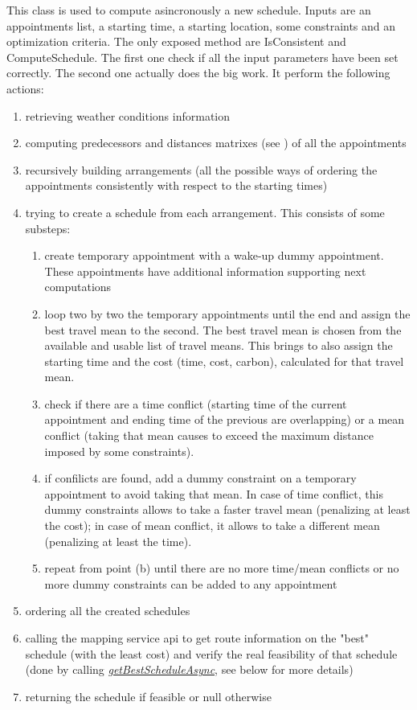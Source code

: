 This class is used to compute asincronously a new schedule. Inputs are an appointments list, a starting time, a starting location, some constraints and an optimization criteria. The only exposed method are IsConsistent and ComputeSchedule. The first one check if all the input parameters have been set correctly. The second one actually does the big work. It perform the following actions:
\begin{enumerate}
\item retrieving weather conditions information
\item computing predecessors and distances matrixes (see ) of all the appointments
\item recursively building arrangements (all the possible ways of ordering the  appointments consistently with respect to the starting times)
\item trying to create a schedule from each arrangement. This consists of some substeps:
\begin{enumerate}
\item create temporary appointment with a wake-up dummy appointment. These appointments have additional information supporting next computations
\item loop two by two the temporary appointments until the end and assign the best travel mean to the second. The best travel mean is chosen from the available and usable list of travel means. This brings to also assign the starting time and the cost (time, cost, carbon), calculated for that travel mean.
\item check if there are a time conflict (starting time of the current appointment and ending time of the previous are overlapping) or a mean conflict (taking that mean causes to exceed the maximum distance imposed by some constraints).
\item if confilicts are found, add a dummy constraint on a temporary appointment to avoid taking that mean. In case of time conflict, this dummy constraints allows to take a faster travel mean (penalizing at least the cost); in case of mean conflict, it allows to take a different mean (penalizing at least the time).
\item repeat from point (b) until there are no more time/mean conflicts or no more dummy constraints can be added to any appointment
\end{enumerate}

\item ordering all the created schedules
\item calling the mapping service api to get route information on the "best" schedule (with the least cost) and verify the real feasibility of that schedule (done by calling \hyperref[method:getBestScheduleAsync]{ \textit{getBestScheduleAsync}}, see below for more details)
\item returning the schedule if feasible or null otherwise
\end{enumerate}


